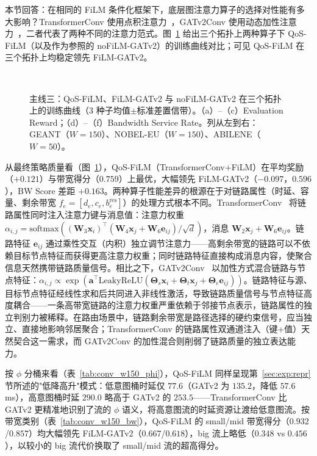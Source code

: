 本节回答：在相同的 FiLM 条件化框架下，底层图注意力算子的选择对性能有多大影响？TransformerConv 使用点积注意力~\cite{Shi2021_UniMP}，GATv2Conv 使用动态加性注意力~\cite{Brody2022_GATv2}，二者代表了两种不同的注意力范式。图~\ref{fig:conv_training} 给出三个拓扑上两种算子下 QoS-FiLM（以及作为参照的 noFiLM-GATv2）的训练曲线对比；可见 QoS-FiLM 在三个拓扑上均稳定领先 FiLM-GATv2。

\begin{figure}[t]
\centering
{}\hfill
{}\hfill
{}\\[4pt]
\hfill
{}\hfill
{}
\caption{主线三：QoS-FiLM、FiLM-GATv2 与 noFiLM-GATv2 在三个拓扑上的训练曲线（3 种子均值$\pm$标准差置信带）。（a）--（c）Evaluation Reward；（d）--（f）Bandwidth Service Rate。列从左到右：GEANT（$W\!=\!150$）、NOBEL-EU（$W\!=\!150$）、ABILENE（$W\!=\!50$）。}
\label{fig:conv_training}
\end{figure}

从最终策略质量看（图~\ref{fig:conv_training}），QoS-FiLM（TransformerConv$+$FiLM）在平均奖励（$+0.121$）与带宽得分（$0.759$）上最优，大幅领先 FiLM-GATv2（$-0.097$，$0.596$），BW Score 差距 $+0.163$。两种算子性能差异的根源在于对链路属性（时延、容量、剩余带宽 $f_e=[d_e,c_e,b_e^{\text{res}}]$）的处理方式根本不同。TransformerConv~\cite{Shi2021_UniMP} 将链路属性同时注入注意力键与消息值：注意力权重 $\alpha_{i,j}=\mathrm{softmax}((\mathbf{W}_3\mathbf{x}_i)^{\top}(\mathbf{W}_4\mathbf{x}_j+\mathbf{W}_6\mathbf{e}_{ij})/\sqrt{d})$，消息 $\mathbf{W}_2\mathbf{x}_j+\mathbf{W}_6\mathbf{e}_{ij}$。链路特征 $\mathbf{e}_{ij}$ 通过乘性交互（内积）独立调节注意力——高剩余带宽的链路可以不依赖目标节点特征而获得更高注意力权重；同时链路特征直接构成消息内容，使聚合信息天然携带链路质量信号。相比之下，GATv2Conv~\cite{Brody2022_GATv2} 以加性方式混合链路与节点特征：$\alpha_{i,j}\propto\exp(\mathbf{a}^{\top}\mathrm{LeakyReLU}(\mathbf{\Theta}_s\mathbf{x}_i+\mathbf{\Theta}_t\mathbf{x}_j+\mathbf{\Theta}_e\mathbf{e}_{ij}))$。链路特征与源、目标节点特征经线性求和后共同进入非线性激活，导致链路质量信号与节点特征高度耦合——一条高带宽链路的注意力权重严重依赖于邻接节点表示，链路属性的独立判别力被稀释。在路由场景中，链路剩余带宽是路径选择的硬约束信号，应当独立、直接地影响邻居聚合；TransformerConv 的链路属性双通道注入（键+值）天然契合这一需求，而 GATv2Conv 的加性混合则削弱了链路质量的独立表达能力。

按 $\phi$ 分桶来看（表~\ref{tab:conv_w150_phi}），QoS-FiLM 同样呈现第~\ref{sec:exp:repr} 节所述的"低降高升"模式：低意图桶时延仅 $77.6$（GATv2 为 $135.2$，降低 $57.6$ms），高意图桶时延 $290.0$ 略高于 GATv2 的 $253.5$——TransformerConv 比 GATv2 更精准地识别了流的 $\phi$ 语义，将高意图流的时延资源让渡给低意图流。按带宽类别（表~\ref{tab:conv_w150_bw}），QoS-FiLM 的 small/mid 带宽得分（$0.932$/$0.857$）均大幅领先 FiLM-GATv2（$0.667$/$0.618$），big 流上略低（$0.348$ vs $0.456$），以较小的 big 流代价换取了 small/mid 流的超高得分。

